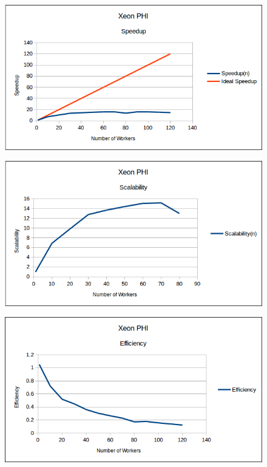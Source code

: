 \documentclass[10pt]{article}
\numberwithin{equation}{section}
\begin{document}
\begin{figure} 
	\centering
	\includegraphics[scale=.75]{XeonPHI_Speedup.png}
	\label{fig:xeonphispeeduptime}
\end{figure}

\begin{figure} 
	\centering
	\includegraphics[scale=.75]{XeonPHI_Scalability.png}
	\label{fig:xeonphiscalability}
\end{figure}

\begin{figure} 
	\centering
	\includegraphics[scale=.75]{XeonPHI_Efficiency.png}
	\label{fig:xeonphiefficiency}
\end{figure}
\end{document}
